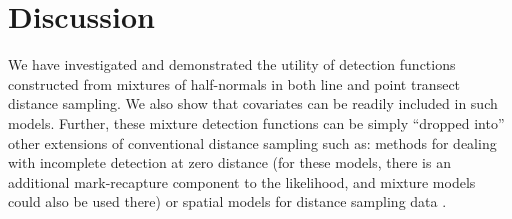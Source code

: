\documentclass[useAMS,referee,usenatbib]{biom}
\begin{document}

\section{Discussion}
\label{s:discuss}

We have investigated and demonstrated the utility of detection functions constructed from mixtures of half-normals in both line and point transect distance sampling. We also show that covariates can be readily included in such models. Further, these mixture detection functions can be simply ``dropped into'' other extensions of conventional distance sampling such as: methods for dealing with incomplete detection at zero distance \citep{Laake:2004tz, Laake:2011vm} (for these models, there is an additional mark-recapture component to the likelihood, and mixture models could also be used there) or spatial models for distance sampling data \citep{Hedley:2004et, Miller:2013us}.
\end{document}

